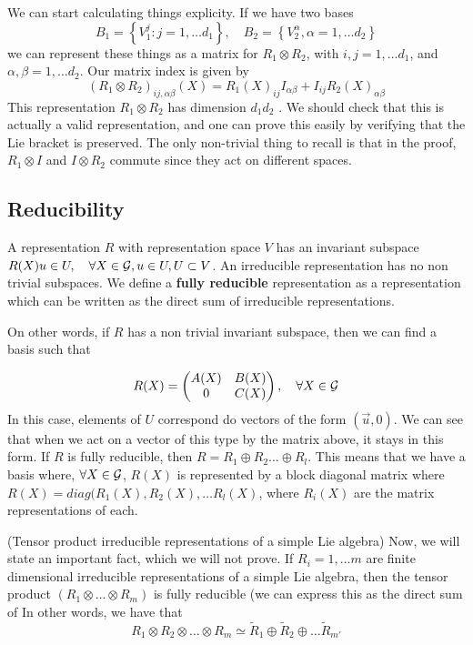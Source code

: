 We can start calculating things explicity. 
If we have two bases 
 \[
 B _ 1 = \left\{ V ^ j _ 1 : j = 1 , \dots d _ 1  \right\}, \quad B_ 2  = \left\{  
 V _ 2 ^ \alpha, \alpha = 1 , \dots d_ 2  \right\}   
\] we can represent these things as a matrix 
for $ R _ 1 \otimes R_ 2 $, with $ i , j =  1, \dots d_ 1  $,
and $ \alpha , \beta = 1, \dots d_ 2 $. 
Our matrix index is given by 
\[
	( R  _1 \otimes R_ 2 ) _{ ij , \alpha \beta } ( X) =
	R _ 1 ( X) _{ ij } I _{ \alpha  \beta } + I _{ ij } R _ 2 ( X) _{ \alpha \beta }
\] This representation $ R _ 1 \otimes R _2 $ has dimension 
$ d_1d_2 $ . We should check that this is actually a valid representation, 
and one can prove this easily by verifying that the Lie bracket is 
preserved. The only non-trivial thing to recall is that 
in the proof, $ R_ 1 \otimes I $ and  $ I \otimes R _ 2 $ commute 
since they act on different spaces. 

\subsection{Reducibility} 
A representation $ R $ with representation space $ V $ 
has an invariant subspace $ R ( X) u \in U , \quad \forall X \in \mathcal{ G } , u 
\in U , U \subset V $. 
An irreducible representation has no non trivial subspaces. 
We define a \textbf{fully reducible} representation as a representation 
which can be written as the direct sum of irreducible 
representations.

On other words, if $ R $ has a non trivial invariant subspace, then we 
can find a basis such that 

\[
	R ( X) = \begin{pmatrix} A ( X) & B ( X) \\ 0 & C ( X)  \end{pmatrix} , 
	\quad \forall X \in \mathcal{ \mathcal{ G }}
\] In this case, elements of $ U $ correspond do vectors of the form 
$ ( \vec{u}, 0 ) $. We can see that when we act on a vector of this type 
by the matrix above, it stays in this form. 
If $ R $ is fully reducible, then 
$ R = R _ 1 \oplus R _ 2 \dots \oplus R _l $. This means
that we have a basis where,  $ \forall X \in \mathcal{ G }$,  $ R( X) $ 
is represented by a block diagonal matrix where 
$ R ( X) = diag ( R_ 1 ( X) , R_ 2 ( X)  , \dots R_ l ( X)  $, 
where  $ R _ i ( X) $ are the matrix representations
of each. 

\begin{theorem}{(Tensor product irreducible representations of a simple Lie algebra)} 
Now, we will state an important fact, which we will not prove. 
If $ R_ i = 1 , \dots m $ are finite dimensional 
irreducible representations of a simple Lie algebra, then the tensor 
product $ ( R_ 1 \otimes \dots \otimes R _ m ) $ is fully reducible (we 
can express this as the direct sum of In other words, we 
have that 
 \[
 R_ 1 \otimes R_ 2 \otimes \dots \otimes R_ m \simeq 
 \tilde{ R } _ 1 \oplus \tilde{ R} _ 2 \oplus \dots \tilde{ R  }_{ m ' }   
\] 
\end{theorem}
 
